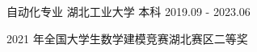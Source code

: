 

\begin{cventries}

  \cventry
    {自动化专业} %
    {湖北工业大学} %
    {本科} %
    {2019.09 - 2023.06} %
    {
      \begin{cvitems} %
        \item {2021 年全国大学生数学建模竞赛湖北赛区二等奖}
      \end{cvitems}
    }
  
\end{cventries}
